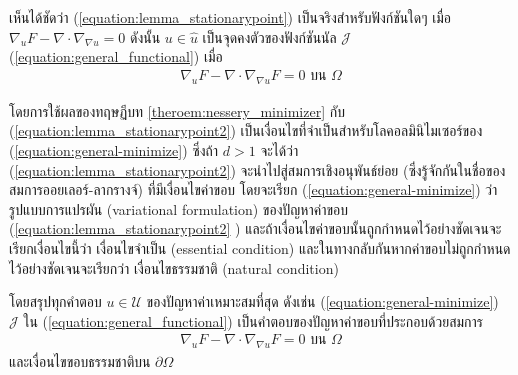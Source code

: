 \hspace{1cm} เห็นได้ชัดว่า (\ref{equation:lemma_stationarypoint}) เป็นจริงสำหรับฟังก์ชันใดๆ เมื่อ $\nabla_u F - \nabla \cdot \nabla_{\nabla u} = 0$ ดังนั้น $u \in \hat{u}$ เป็นจุดคงตัวของฟังก์ชันนัล $\mathcal{J}$ (\ref{equation:general_functional}) เมื่อ 
\begin{align}
    \nabla_{u} F - \nabla \cdot \nabla_{\nabla u} F = 0 \text{ บน } \Omega
    \label{equation:lemma_stationarypoint2}
\end{align}

โดยการใช้ผลของทฤษฏีบท \ref{theroem:nessery_minimizer} กับ (\ref{equation:lemma_stationarypoint2}) เป็นเงื่อนไขที่จำเป็นสำหรับโลคอลมินิไมเซอร์ของ (\ref{equation:general-minimize}) ซึ่งถ้า $ d > 1$ จะได้ว่า (\ref{equation:lemma_stationarypoint2}) จะนำไปสู่สมการเชิงอนุพันธ์ย่อย (ซึ่งรู้จักกันในชื่อของสมการออยเลอร์-ลากรางจ์) ที่มีเงื่อนไขค่าขอบ โดยจะเรียก (\ref{equation:general-minimize}) ว่า รูปแบบการแปรผัน (variational formulation) ของปัญหาค่าขอบ (\ref{equation:lemma_stationarypoint2}
) และถ้าเงื่อนไขค่าขอบนั้นถูกกำหนดไว้อย่างชัดเจนจะเรียกเงื่อนไขนี้ว่า เงื่อนไขจำเป็น (essential condition) และในทางกลับกันหากค่าขอบไม่ถูกกำหนดไว้อย่างชัดเจนจะเรียกว่า เงื่อนไขธรรมชาติ (natural condition) 

\hspace{1cm} โดยสรุปทุกคำตอบ $u \in \mathcal{U}$ ของปัญหาค่าเหมาะสมที่สุด ดังเช่น (\ref{equation:general-minimize}) $\mathcal{J}$ ใน (\ref{equation:general_functional}) เป็นคำตอบของปัญหาค่าขอบที่ประกอบด้วยสมการ
\begin{align*}
    \nabla_u F - \nabla \cdot \nabla_{\nabla u} F = 0 \text{ บน } \Omega 
\end{align*}
และเงื่อนไขขอบธรรมชาติบน $\partial \Omega$

